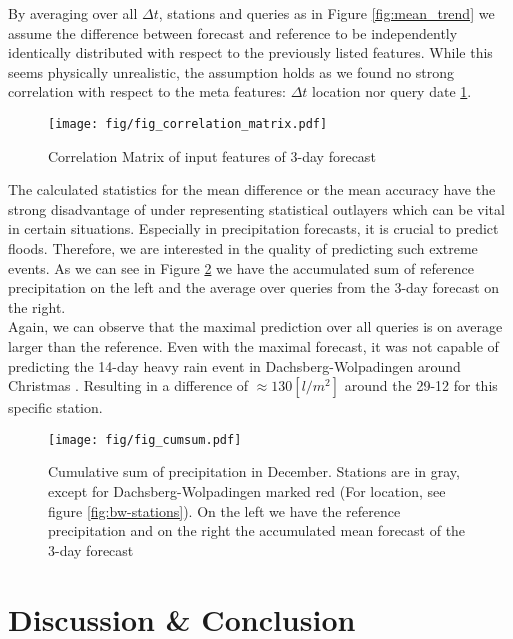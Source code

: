 \documentclass{article}
\theoremstyle{plain}
\theoremstyle{definition}
\theoremstyle{remark}
\begin{document}
By averaging over all $\Delta t$, stations and queries as in Figure
\ref{fig:mean_trend} we assume the difference between forecast and reference to
be independently identically distributed with respect to the previously listed
features. While this seems physically unrealistic, the assumption holds as we
found no strong correlation with respect to the meta features: $\Delta t$
location nor query date \ref{fig:corr_matrix}.

\begin{figure}[h]
    \centering
    \texttt{[image: fig/fig\_correlation\_matrix.pdf]}
    \caption{Correlation Matrix of input features of 3-day forecast}
    \label{fig:corr_matrix}
\end{figure}

The calculated statistics for the mean difference or the mean accuracy have the
strong disadvantage of under representing statistical outlayers which can be
vital in certain situations. Especially in precipitation forecasts, it is
crucial to predict floods. Therefore, we are interested in the quality of
predicting such extreme events. As we can see in Figure
\ref{fig:cum_sum_heavy_rain} we have the accumulated sum of reference
precipitation on the left and the average over queries from the 3-day forecast
on the right. \\
Again, we can observe that the maximal prediction over all queries is on
average larger than the reference.
Even with the maximal forecast, it was not capable of predicting the 14-day
heavy rain event in Dachsberg-Wolpadingen around Christmas
\cite{flooding_christmas}. Resulting in a difference of  $\approx 130 [l /
            m^2]$ around the 29-12 for this specific station.


\begin{figure}[h]
    \centering
    \texttt{[image: fig/fig\_cumsum.pdf]}
    \caption{Cumulative sum of precipitation in December. Stations are in gray,
        except for Dachsberg-Wolpadingen marked red (For location, see figure
        \ref{fig:bw-stations}). On the left we have the reference precipitation and on
        the right the accumulated mean forecast of the 3-day forecast}
    \label{fig:cum_sum_heavy_rain}
\end{figure}

\section{Discussion \& Conclusion}\label{sec:conclusion}
\end{document}
